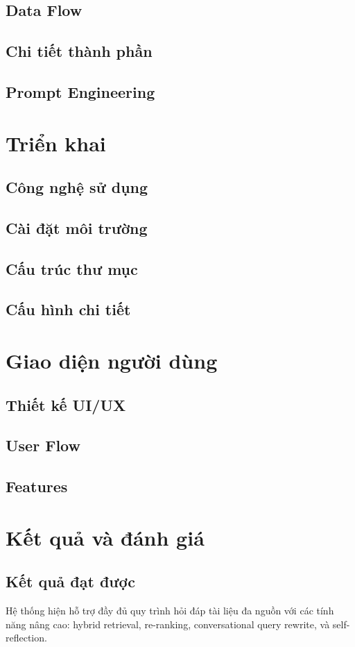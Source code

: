 \documentclass[12pt,a4paper]{article}
\begin{document}
\subsection{Data Flow}
\subsection{Chi tiết thành phần}
\subsection{Prompt Engineering}

\section{Triển khai}
\subsection{Công nghệ sử dụng}
\subsection{Cài đặt môi trường}
\subsection{Cấu trúc thư mục}
\subsection{Cấu hình chi tiết}

\section{Giao diện người dùng}
\subsection{Thiết kế UI/UX}
\subsection{User Flow}
\subsection{Features}

\section{Kết quả và đánh giá}
\subsection{Kết quả đạt được}
Hệ thống hiện hỗ trợ đầy đủ quy trình hỏi đáp tài liệu đa nguồn với các tính năng nâng cao: hybrid retrieval, re-ranking, conversational query rewrite, và self-reflection.
\end{document}
